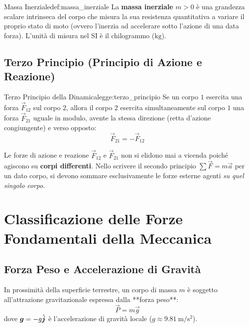 \begin{definizione}{Massa Inerziale}{def:massa_inerziale}
La \textbf{massa inerziale} $m > 0$ è una grandezza scalare intrinseca del corpo che misura la sua resistenza quantitativa a variare il proprio stato di moto (ovvero l'inerzia ad accelerare sotto l'azione di una data forza). L'unità di misura nel SI è il chilogrammo ($\si{\kilogram}$).
\end{definizione}

\subsection{Terzo Principio (Principio di Azione e Reazione)}

\begin{legge}{Terzo Principio della Dinamica}{legge:terzo_principio}
Se un corpo $1$ esercita una forza $\vec{F}_{12}$ sul corpo $2$, allora il corpo $2$ esercita simultaneamente sul corpo $1$ una forza $\vec{F}_{21}$ uguale in modulo, avente la stessa direzione (retta d'azione congiungente) e verso opposto:
\begin{equation}
    \vec{F}_{21} = -\vec{F}_{12}
    \label{eq:terzo_principio}
\end{equation}
\end{legge}

\begin{esame}
Le forze di azione e reazione $\vec{F}_{12}$ e $\vec{F}_{21}$ non si elidono mai a vicenda poiché agiscono su \textbf{corpi differenti}. Nello scrivere il secondo principio $\sum\vec{F} = m\vec{a}$ per un dato corpo, si devono sommare esclusivamente le forze esterne agenti \emph{su quel singolo corpo}.
\end{esame}

\section{Classificazione delle Forze Fondamentali della Meccanica}
\label{sec:forze_meccanica}

\subsection{Forza Peso e Accelerazione di Gravità}
In prossimità della superficie terrestre, un corpo di massa $m$ è soggetto all'attrazione gravitazionale espressa dalla **forza peso**:
\begin{equation}
    \vec{P} = m\vec{g}
\end{equation}
dove $\bm{g} = -g\hat{\bm{j}}$ è l'accelerazione di gravità locale ($g \approx \SI{9.81}{\metre\per\second\squared}$).

